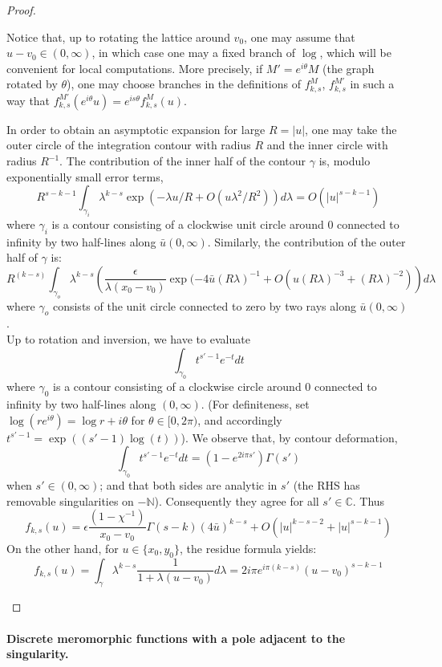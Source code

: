 \documentclass[10pt]{article}
\newcommand{\N}{\mathbb{N}}
\newcommand{\C}{\mathbb{C}}
\begin{document}
\begin{proof}
\begin{enumerate}
Notice that, up to rotating the lattice around $v_0$, one may assume that $u-v_0\in (0,\infty)$, in which case one may a fixed branch of $\log$, which will be convenient for local computations. More precisely, if $M'=e^{i\theta}M$ (the graph rotated by $\theta$), one may choose branches in the definitions of $f^{M}_{k,s}$, $f^{M'}_{k,s}$ in such a way that $f^{M'}_{k,s}(e^{i\theta}u)=e^{is\theta}f^{M}_{k,s}(u)$. 

In order to obtain an asymptotic expansion for large $R=|u|$, one may take the outer circle of the integration contour with radius $R$ and the inner circle with radius $R^{-1}$.  The contribution of the inner half of the contour $\gamma$ is, modulo exponentially small error terms, 
$$R^{s-k-1}\int_{\gamma_i}\lambda^{k-s}\exp(-\lambda u/R+O(u\lambda^2/R^2))d\lambda=O(|u|^{s-k-1})$$
where $\gamma_i$ is a contour consisting of a clockwise unit circle around 0 connected to infinity by two half-lines along $\bar u(0,\infty)$.
Similarly, the contribution of the outer half of $\gamma$ is:
$$R^{(k-s)}\int_{\gamma_o}\lambda^{k-s}\left(\frac\epsilon{\lambda (x_0-v_0)} \exp(-4\bar u(R\lambda)^{-1}+O(u(R\lambda)^{-3}+(R\lambda)^{-2})\right)d\lambda$$
where $\gamma_o$ consists of the unit circle connected to zero by two rays along $\bar u(0,\infty)$.\\
Up to rotation and inversion, we have to evaluate 
$$\int_{\gamma_0}t^{s'-1}e^{-t}dt$$
where $\gamma_0$ is a contour consisting of a clockwise circle around 0 connected to infinity by two half-lines along $(0,\infty)$. (For definiteness, set $\log(re^{i\theta})=\log r+i\theta$ for $\theta\in [0,2\pi)$, and accordingly $t^{s'-1}=\exp((s'-1)\log(t))$). We observe that, by contour deformation, 
$$\int_{\gamma_0}t^{s'-1}e^{-t}dt=(1-e^{2i\pi s'})\Gamma(s')$$
when $s'\in(0,\infty)$; and that both sides are analytic in $s'$ (the RHS has removable singularities on $-\N$). Consequently they agree for all $s'\in\C$. Thus
$$f_{k,s}(u)=\epsilon\frac{(1-\chi^{-1})}{x_0-v_0}\Gamma(s-k)(4\bar u)^{k-s}+O(|u|^{k-s-2}+|u|^{s-k-1})$$
On the other hand, for $u\in\{x_0,y_0\}$, the residue formula yields:
$$f_{k,s}(u)=\int_\gamma\lambda^{k-s} \frac{1}{1+\lambda(u-v_0)}d\lambda=2i\pi e^{i\pi(k-s)}(u-v_0)^{s-k-1}
$$


\end{enumerate}
\end{proof}


\paragraph{Discrete meromorphic functions with a pole adjacent to the singularity.\\}
\end{document}
